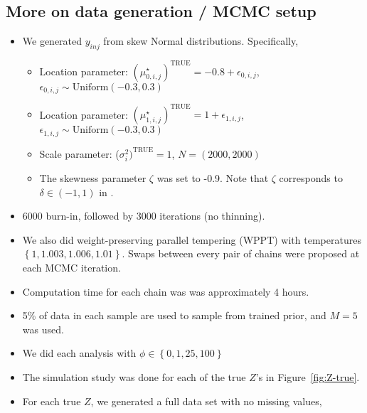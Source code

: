 \documentclass[10pt]{article} %
\newcommand{\p}[1]{\left(#1\right)}
\newcommand{\bc}[1]{ \left\{#1\right\} }
\newcommand{\Uniform}{ \text{Uniform} }
\def\true{\text{TRUE}}
\begin{document}
\subsection{More on data generation / MCMC setup}
\begin{itemize}
  \item We generated $y_{inj}$ from skew Normal distributions. Specifically,
  \begin{itemize}
    \item Location parameter: $(\mu_{0,i,j}^\star)^\true=-0.8 +
      \epsilon_{0,i,j}$, $\epsilon_{0,i,j} \sim \Uniform(-0.3, 0.3)$
    \item Location parameter: $(\mu_{1,i,j}^\star)^\true=1 +
      \epsilon_{1,i,j}$, $\epsilon_{1,i,j} \sim \Uniform(-0.3, 0.3)$
    \item Scale parameter: ($\sigma^2_i)^\true=1$, $N=(2000, 2000)$
    \item The skewness parameter $\zeta$ was set to -0.9. Note that $\zeta$
          corresponds to $\delta \in \p{-1, 1}$ in \cite{fruhwirth2010bayesian}.
  \end{itemize}
  \item 6000 burn-in, followed by 3000 iterations (no thinning).
  \item We also did weight-preserving parallel tempering (WPPT) with temperatures 
        $\bc{1, 1.003, 1.006, 1.01}$. Swaps between every pair of chains were
        proposed at each MCMC iteration.
  \item Computation time for each chain was was approximately 4 hours.
  \item 5\% of data in each sample are used to sample from trained prior, and
    $M=5$ was used.
  \item We did each analysis with $\phi \in \bc{0, 1, 25, 100}$
  \item The simulation study was done for each of the true $Z$'s in 
        Figure~\ref{fig:Z-true}.
  \item For each true $Z$, we generated a full data set with no missing values,

\end{itemize}
\end{document}
